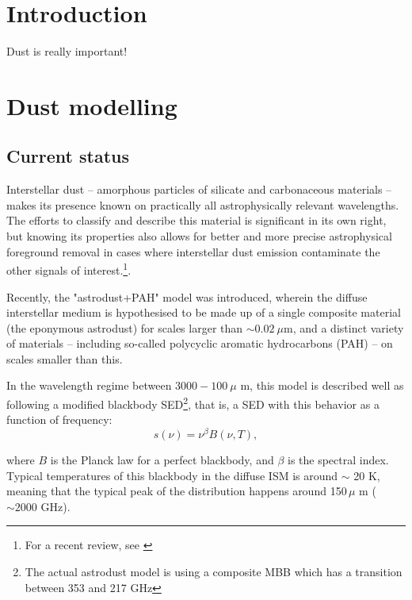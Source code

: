 \documentclass{aa}
\begin{document}
   \maketitle

\setcounter{tocdepth}{2}
\tableofcontents
   
\section{Introduction}
Dust is really important!

\clearpage
\section{Dust modelling}
\subsection{Current status}
Interstellar dust -- amorphous particles of silicate and carbonaceous materials -- makes its presence known on practically all astrophysically relevant wavelengths. The efforts to classify and describe this material is significant in its own right, but knowing its properties also allows for better and more precise astrophysical foreground removal in cases where interstellar dust emission contaminate the other signals of interest.\footnote{For a recent review, see \cite{Hensley2021}}.

Recently, the "astrodust+PAH" model \citep{Hensley2022} was introduced, wherein the diffuse interstellar medium is hypothesised to be made up of a single composite material (the eponymous astrodust) for scales larger than $\sim0.02~\mu$m, and a distinct variety of materials -- including so-called polycyclic aromatic hydrocarbons (PAH) -- on scales smaller than this.

In the wavelength regime between $3000-100~\mu$ m, this model is described well as following a modified blackbody SED\footnote{The actual astrodust model is using a composite MBB which has a transition between 353 and 217 GHz}, that is, a SED with this behavior as a function of frequency:
\begin{equation}
s(\nu) = \nu^\beta B(\nu, T),
\label{eq:mbb}
\end{equation}

where $B$ is the Planck law for a perfect blackbody, and $\beta$ is the spectral index. Typical temperatures of this blackbody in the diffuse ISM is around $\sim$ 20 K, meaning that the typical peak of the distribution happens around 150\,$\mu$ m ($\sim 2000$ GHz).
\end{document}
